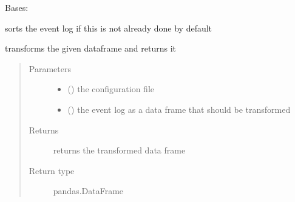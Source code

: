 \documentclass[letterpaper,10pt,english]{sphinxmanual}
\begin{document}

\begin{fulllineitems}
\label{\detokenize{event_log_analyzer:event_log_analyzer.adapter.Sorter}}
\sphinxAtStartPar
Bases: {\hyperref[\detokenize{event_log_analyzer:event_log_analyzer.adapter.Adapter}]{}}

\sphinxAtStartPar
sorts the event log if this is not already done by default

\begin{fulllineitems}
\label{\detokenize{event_log_analyzer:event_log_analyzer.adapter.Sorter.transform}}
\sphinxAtStartPar
transforms the given dataframe and returns it
\begin{quote}\begin{description}
\item[{Parameters}] \leavevmode\begin{itemize}
\item {} 
\sphinxAtStartPar
{} () \textendash{} the configuration file

\item {} 
\sphinxAtStartPar
{} () \textendash{} the event log as a data frame that should be transformed

\end{itemize}

\item[{Returns}] \leavevmode
\sphinxAtStartPar
returns the transformed data frame

\item[{Return type}] \leavevmode
\sphinxAtStartPar
pandas.DataFrame

\end{description}\end{quote}

\end{fulllineitems}


\end{fulllineitems}
\end{document}
